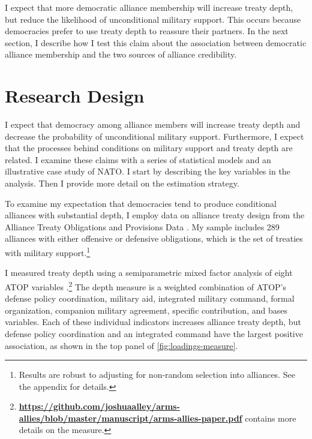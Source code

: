 \documentclass[12pt]{article}
\begin{document}
I expect that more democratic alliance membership will increase treaty depth, but reduce the likelihood of unconditional military support.  
This occurs because democracies prefer to use treaty depth to reassure their partners. 
In the next section, I describe how I test this claim about the association between democratic alliance membership and the two sources of alliance credibility. 



\section{Research Design}

 
I expect that democracy among alliance members will increase treaty depth and decrease the probability of unconditional military support. 
Furthermore, I expect that the processes behind conditions on military support and treaty depth are related. 
I examine these claims with a series of statistical models and an illustrative case study of NATO. 
I start by describing the key variables in the analysis. 
Then I provide more detail on the estimation strategy. 


To examine my expectation that democracies tend to produce conditional alliances with substantial depth, I employ data on alliance treaty design from the Alliance Treaty Obligations and Provisions Data \citep{Leedsetal2002}. 
My sample includes 289 alliances with either offensive or defensive obligations, which is the set of treaties with military support.\footnote{Results are robust to adjusting for non-random selection into alliances. See the appendix for details.} 


I measured treaty depth using a semiparametric mixed factor analysis of eight ATOP variables \citep{Murrayetal2013}.\footnote{\textbf{\url{https://github.com/joshuaalley/arms-allies/blob/master/manuscript/arms-allies-paper.pdf}} contains more details on the measure.}
The depth measure is a weighted combination of ATOP's defense policy coordination, military aid, integrated military command, formal organization, companion military agreement, specific contribution, and bases variables. 
Each of these individual indicators increases alliance treaty depth, but defense policy coordination and an integrated command have the largest positive association, as shown in the top panel of \autoref{fig:loadings-measure}. 
\end{document}
